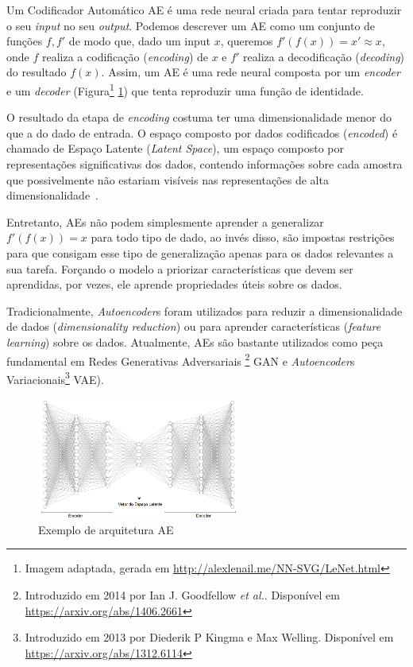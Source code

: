 Um Codificador Automático \acrlong{AE} é uma rede neural criada para tentar reproduzir o seu \textit{input} no seu \textit{output}. Podemos descrever um \acrshort{AE} como um conjunto de funções $f, f'$ de modo que, dado um input $x$, queremos $f'(f(x)) = x' \approx x$, onde $f$ realiza a codificação (\textit{encoding}) de $x$ e $f'$ realiza a decodificação (\textit{decoding}) do resultado $f(x)$. Assim, um \acrshort{AE} é uma rede neural composta por um \textit{encoder} e um \textit{decoder} (Figura\footnote{Imagem adaptada, gerada em \url{http://alexlenail.me/NN-SVG/LeNet.html}} \ref{fig:exarqae}) que tenta reproduzir uma função de identidade.

O resultado da etapa de \textit{encoding} costuma ter uma dimensionalidade menor do que a do dado de entrada. O espaço composto por dados codificados (\textit{encoded}) é chamado de Espaço Latente (\textit{Latent Space}), um espaço composto por representações significativas dos dados, contendo informações sobre cada amostra que possivelmente não estariam visíveis nas representações de alta dimensionalidade~\cite{60}.

Entretanto, \acrshort{AE}s não podem simplesmente aprender a generalizar $f'(f(x)) = x$ para todo tipo de dado, ao invés disso, são impostas restrições para que consigam esse tipo de generalização apenas para os dados relevantes a sua tarefa. Forçando o modelo a priorizar características que devem ser aprendidas, por vezes, ele aprende propriedades úteis sobre os dados.

Tradicionalmente, \textit{Autoencoder}s foram utilizados para reduzir a dimensionalidade de dados (\textit{dimensionality reduction}) ou para aprender características (\textit{feature learning}) sobre os dados. Atualmente, \acrshort{AE}s são bastante utilizados como peça fundamental em Redes Generativas Adversariais \footnote{Introduzido em 2014 por Ian J. Goodfellow \textit{et al.}. Disponível em \url{https://arxiv.org/abs/1406.2661}} \acrlong{GAN} e \textit{Autoencoder}s Variacionais\footnote{Introduzido em 2013 por Diederik P Kingma e Max Welling. Disponível em \url{https://arxiv.org/abs/1312.6114}} \acrlong{VAE}).

\begin{figure}[!h]
\centering
\includegraphics[width=0.6\textwidth]{img/ex-ae.PNG}
\caption{\label{fig:exarqae}Exemplo de arquitetura \acrshort{AE}}
\end{figure}


